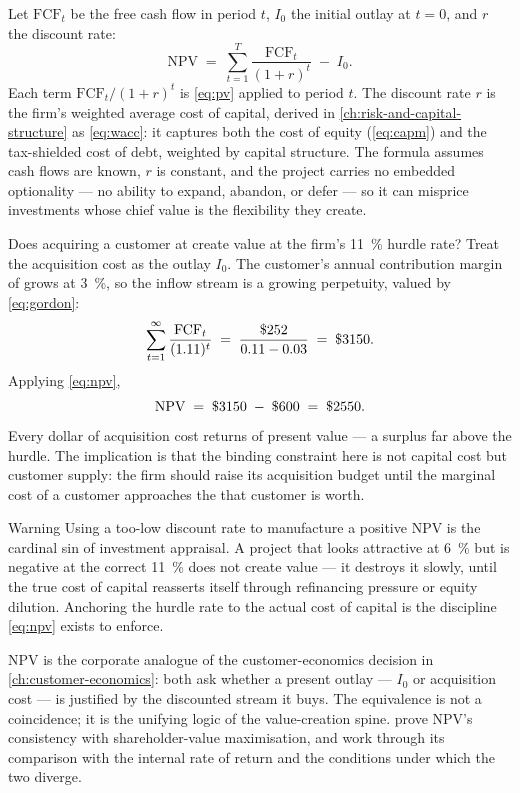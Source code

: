 Let \(\mathrm{FCF}_t\) be the free cash flow in period \(t\), \(I_0\) the initial outlay at
\(t=0\), and \(r\) the discount rate:
\begin{equation}\label{eq:npv}
  \mathrm{NPV} \;=\; \sum_{t=1}^{T}\frac{\mathrm{FCF}_t}{(1+r)^{t}} \;-\; I_0.
\end{equation}
Each term \(\mathrm{FCF}_t/(1+r)^t\) is \cref{eq:pv} applied to period \(t\). The discount
rate \(r\) is the firm's weighted average cost of capital, derived in
\cref{ch:risk-and-capital-structure} as \cref{eq:wacc}: it captures both the cost of equity
(\cref{eq:capm}) and the tax-shielded cost of debt, weighted by capital structure. The
formula assumes cash flows are known, \(r\) is constant, and the project carries no embedded
optionality --- no ability to expand, abandon, or defer --- so it can misprice investments
whose chief value is the flexibility they create.

\begin{example}
Does acquiring a customer at  create value at the firm's \qty{11}{\percent} hurdle
rate? Treat the  acquisition cost as the outlay \(I_0\). The customer's annual
contribution margin of  grows at \qty{3}{\percent}, so the inflow stream is a
growing perpetuity, valued by \cref{eq:gordon}:
\[
  \sum_{t=1}^{\infty}\frac{\mathrm{FCF}_t}{(1.11)^t}
  \;=\; \frac{\$\num{252}}{0.11-0.03}
  \;=\; \$\num{3150}.
\]
Applying \cref{eq:npv},
\[
  \mathrm{NPV} \;=\; \$\num{3150} \;-\; \$\num{600} \;=\; \$\num{2550}.
\]
Every dollar of acquisition cost returns  of present value --- a surplus far above
the hurdle. The implication is that the binding constraint here is not capital cost but
customer supply: the firm should raise its acquisition budget until the marginal cost of a
customer approaches the  that customer is worth.
\end{example}

\begin{admonition}{Warning}
Using a too-low discount rate to manufacture a positive NPV is the cardinal sin of investment
appraisal. A project that looks attractive at \qty{6}{\percent} but is negative at the correct
\qty{11}{\percent} does not create value --- it destroys it slowly, until the true cost of
capital reasserts itself through refinancing pressure or equity dilution. Anchoring the hurdle
rate to the actual cost of capital is the discipline \cref{eq:npv} exists to enforce.
\end{admonition}

NPV is the corporate analogue of the customer-economics decision in
\cref{ch:customer-economics}: both ask whether a present outlay --- \(I_0\) or acquisition
cost --- is justified by the discounted stream it buys. The equivalence is not a coincidence;
it is the unifying logic of the value-creation spine. \textcite{brealey2020} prove NPV's
consistency with shareholder-value maximisation, and \textcite{ross2022} work through its
comparison with the internal rate of return and the conditions under which the two diverge.
